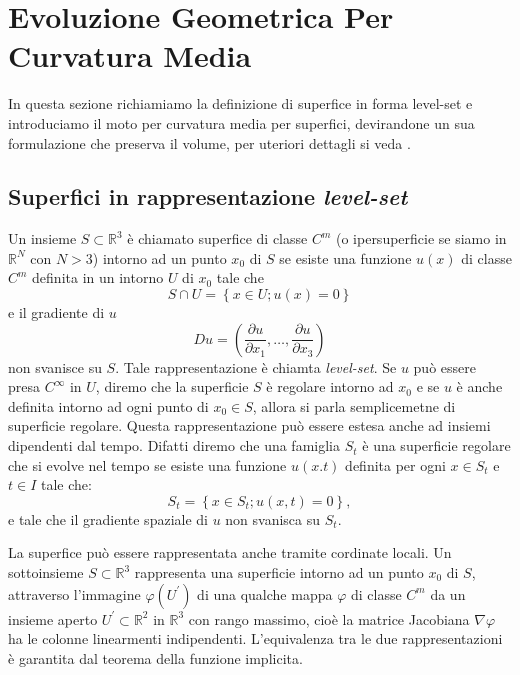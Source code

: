 \chapter{Evoluzione Geometrica Per Curvatura Media}
\label{cap:cap1}
In questa sezione richiamiamo la definizione di superfice in forma
level-set e introduciamo il moto per curvatura media per superfici,
devirandone un sua formulazione che preserva il volume, per uteriori
dettagli si veda \cite{gui:sapiro,sapiro:tann}.
%
%
\section{Superfici in rappresentazione \emph{level-set}}
\label{sec:cp1-00}
Un insieme $S\subset\mathbb{R}^3$ è chiamato superfice di classe $C^m$ (o ipersuperficie se siamo in $\mathbb{R}^N$ con $N>3$) intorno ad un punto $x_0$ di $S$ se esiste una funzione $u(x)$ di classe $C^m$ definita in un intorno $U$ di $x_0$ tale che
\[
S\cap U=\left\{x\in U; u(x)=0\right\}
\]
e il gradiente di $u$
\[
 Du=\left(\frac{\partial u}{\partial x_1},\dots,\frac{\partial u}{\partial x_3}\right)
\]
non svanisce su $S$. Tale rappresentazione è chiamta \emph{level-set}. Se $u$ può essere presa $C^{\infty}$ in $U$, diremo che la superficie $S$ è regolare intorno ad $x_0$ e se $u$ è anche definita intorno ad ogni punto di $x_0\in S$, allora si parla semplicemetne di superficie regolare. Questa rappresentazione può essere estesa anche ad insiemi dipendenti dal tempo. Difatti diremo che una famiglia $S_t$ è una superficie regolare che si evolve nel tempo se esiste una funzione $u(x.t)$ definita per ogni $x\in S_t$ e $t\in I$ tale che:
\[
S_t=\left\{x\in S_t; u(x,t)=0\right\},
\]
e tale che il gradiente spaziale di $u$ non svanisca su $S_t$.
\begin{osservazione}
 La superfice può essere rappresentata anche tramite cordinate locali. Un sottoinsieme $S\subset\mathbb{R}^3$ rappresenta una superficie intorno ad un punto $x_0$ di $S$, attraverso l'immagine $\varphi(U^{'})$ di una qualche mappa $\varphi$ di classe $C^m$ da un insieme aperto $U^{'}\subset\mathbb{R}^2$ in $\mathbb{R}^3$ con rango massimo, cioè la matrice Jacobiana $\nabla\varphi$ ha le colonne linearmenti indipendenti.
L'equivalenza tra le due rappresentazioni è garantita dal teorema della funzione implicita.
\end{osservazione} 


